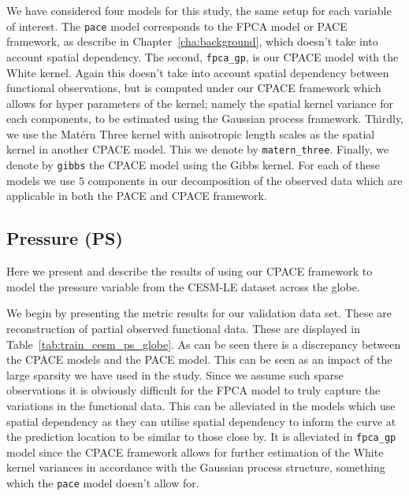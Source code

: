 We have considered four models for this study, the same setup for each variable of interest.
The \verb*|pace| model corresponds to the FPCA model or PACE framework, as describe in Chapter~\ref{cha:background},  which doesn't take into account spatial dependency.
The second, \verb*|fpca_gp|, is our CPACE model with the White kernel.
Again this doesn't take into account spatial dependency between functional observations, but is computed under our CPACE framework which allows for hyper parameters of the kernel; namely the spatial kernel variance for each components, to be estimated using the Gaussian process framework.
Thirdly, we use the Mat\'ern Three kernel with anisotropic length scales as the spatial kernel in another CPACE model.
This we denote by \verb*|matern_three|.
Finally, we denote by \verb*|gibbs| the CPACE model using the Gibbs kernel.
For each of these models we use $5$ components in our decomposition of the observed data which are applicable in both the PACE and CPACE framework. 

\subsection{Pressure (PS)\label{ssec:cesm_ps}}
Here we present and describe the results of using our CPACE framework to model the pressure variable from the CESM-LE dataset across the globe.

We begin by presenting the metric results for our validation data set.
These are reconstruction of partial observed functional data.
These are displayed in Table~\ref{tab:train_cesm_ps_globe}.
As can be seen there is a discrepancy between the CPACE models and the PACE model.
This can be seen as an impact of the large sparsity we have used in the study.
Since we assume such sparse observations it is obviously difficult for the FPCA model to truly capture the variations in the functional data.
This can be alleviated in the models which use spatial dependency as they can utilise spatial dependency to inform the curve at the prediction location to be similar to those close by.
It is alleviated in \verb*|fpca_gp| model since the CPACE framework allows for further estimation of the White kernel variances in accordance with the Gaussian process structure, something which the \verb*|pace| model doesn't allow for. 

